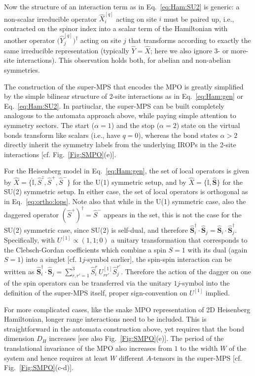 \documentclass[aps,prx,twocolumn,showpacs,psfig,superscriptaddress,longbibliography]{revtex4-1}
\newcommand{\Eq}[1]{Eq.~\eqref{#1}}
\newcommand{\Fig}[1]{Fig.~\ref{#1}}
\begin{document}
Now the structure of an interaction term as in \Eq{eq:Ham:SU2} is
generic: a non-scalar irreducible operator $\hat{X}^{[q]}_i$ acting
on site $i$ must be paired up, i.e., contracted on the spinor index
into a scalar term of the Hamiltonian with another operator
$\bigl(\hat{Y}^{[q]}_j\bigr)^\dagger$ acting on site $j$ that
transforms according to exactly the same irreducible representation
(typically $\hat{Y}=\hat{X}$; here we also ignore 3- or more-site
interactions). This observation holds both, for abelian and
non-abelian symmetries.

The construction of the super-MPS that encodes the MPO is greatly
simplified by the simple bilinear structure of 2-site interactions
as in \Eq{eq:Ham:gen} or \Eq{eq:Ham:SU2}. In partiuclar, the
super-MPS can be built completely analogous to the automata approach
above, while paying simple attention to symmetry sectors.  The start
($\alpha=1$) and the stop ($\alpha=2$) state on the virtual bonds
transform like scalars (i.e., have $q=0$), whereas the bond states
$\alpha>2$ directly inherit the symmetry labels from the underlying
IROPs in the 2-site interactions [cf. \Fig{Fig:SMPO}(e)].

For the Heisenberg model in \Eq{eq:Ham:gen}, the set of local
operators is given by $\hat{X}=\{ \hat{\mathbb{I}}, \hat{S}^z,
\hat{S}^+, \hat{S}^- \}$ for the U(1) symmetric setup, and by
$\hat{X}=\{ \hat{\mathbb{I}}, \hat{\mathbf{S}}\}$ for the SU(2)
symmetric setup. In either case, the set of local operators is
orthogonal as in \Eq{eq:ortho:lops}. Note also that while in the
U(1) symmetric case, also the daggered operator $(\hat{S}^+)^\dagger
= \hat{S}^-$ appears in the set, this is not the case for the SU(2)
symmetric case, since SU(2) is self-dual, and therefore
$\mathbf{\hat{S}}_i^\dagger \cdot \mathbf{\hat{S}}_j =
\mathbf{\hat{S}}_i \cdot \mathbf{\hat{S}}_j ^\dagger $.
Specifically, with $U^{[1]} \propto (1,1;0)$ a unitary
transformation that corresponds to the Clebsch-Gordan coefficients
which combine a spin $S=1$ with its dual (again $S=1$) into a
singlet [cf. $1j$-symbol earlier], the spin-spin interaction can be
written as $\mathbf{\hat{S}}_{i}^\dagger \cdot \mathbf{\hat{S}}_j =
\sum_{r,r'=1}^3 \hat{S}^r_{i} \, U^{[1]}_{rr'} \hat{S}^{r'}_j $.
Therefore the action of the dagger on one of the spin operators can
be transferred via the unitary $1j$-symbol into the definition of
the super-MPS itself, proper sign-convention on $U^{[1]}$ implied.

For more complicated cases, like the snake MPO representation of 2D
Heisenberg Hamiltonian, longer range interactions need to be
included.  This is straightforward in the automata construction
above, yet requires that the bond dimension $D_H$ increases [see
also \Fig{Fig:SMPO}(e)].  The period of the translational invariance
of the MPO also increases from $1$ to the width $W$ of the system
and hence requires at least $W$ different $A$-tensors in the
super-MPS [cf.  \Fig{Fig:SMPO}(c-d)].
\end{document}
